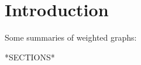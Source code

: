 \documentclass[12pt]{article}
\begin{document}
\maketitle

\section{Introduction}

Some summaries of weighted graphs:

*SECTIONS*
\end{document}
